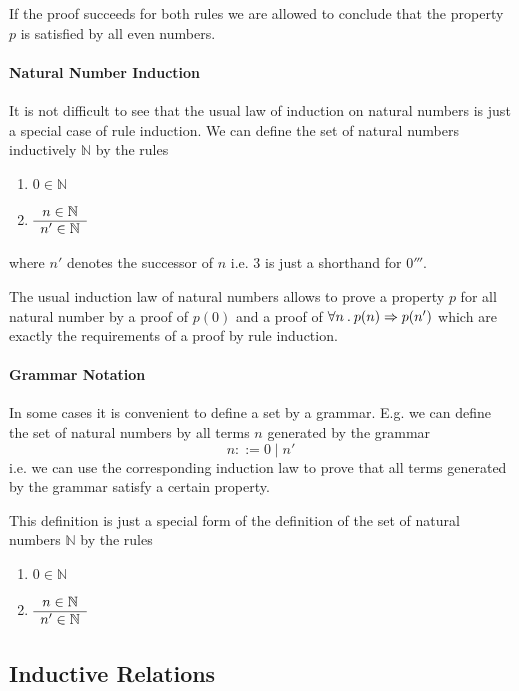 If the proof succeeds for both rules we are allowed to conclude that the
property $p$ is satisfied by all even numbers.



\paragraph{Natural Number Induction}

It is not difficult to see that the usual law of induction on natural numbers
is just a special case of rule induction. We can define the set of natural
numbers inductively $\mathbb{N}$ by the rules
\begin{enumerate}
\item $0 \in \mathbb{N}$
\item $\begin{array}{c} n \in \mathbb{N} \\ \hline n' \in \mathbb{N}\end{array}$
\end{enumerate}
where $n'$ denotes the successor of $n$ i.e. $3$ is just a shorthand for
$0'''$.

The usual induction law of natural numbers allows to prove a property $p$ for
all natural number by a proof of $p(0)$ and a proof of
$\forall n\mathbin. p(n) \Rightarrow p(n')$ which are exactly the requirements of a
proof by rule induction.





\paragraph{Grammar Notation}

In some cases it is convenient to define a set by a grammar. E.g. we can
define the set of natural numbers by all terms $n$ generated by the grammar
%
    $$ n ::= 0 \mid n'$$
%
i.e. we can use the corresponding induction law to prove
that all terms generated by the grammar satisfy a certain property.

This definition is just a special form of the definition of the set of natural
numbers $\mathbb{N}$ by the rules
\begin{enumerate}
\item $0 \in \mathbb{N}$
\item $\begin{array}{c} n \in \mathbb{N} \\ \hline n' \in \mathbb{N}\end{array}$
\end{enumerate}





\subsection{Inductive Relations}


